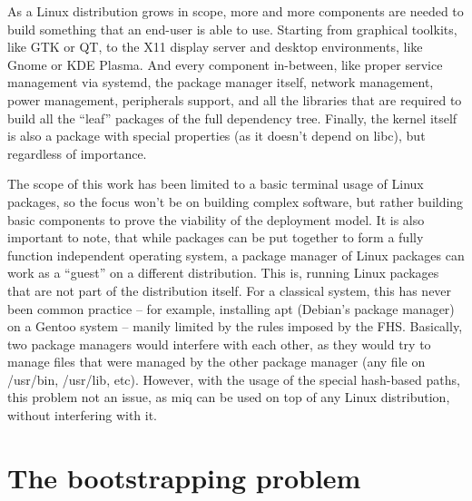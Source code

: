As a Linux distribution grows in scope, more and more
components are needed to build something that an end-user is
able to use. Starting from graphical toolkits, like GTK or
QT, to the X11 display server and desktop environments, like
Gnome or KDE Plasma. And every component in-between, like
proper service management via systemd, the package manager
itself, network management, power management, peripherals
support, and all the libraries that are required to build
all the ``leaf'' packages of the full dependency tree.
Finally, the kernel itself is also a package with special
properties (as it doesn't depend on libc), but regardless of
importance.

The scope of this work has been limited to a basic terminal
usage of Linux packages, so the focus won't be on building
complex software, but rather building basic components to
prove the viability of the deployment model. It is also
important to note, that while packages can be put together
to form a fully function independent operating system, a
package manager of Linux packages can work as a ``guest'' on
a different distribution. This is, running Linux packages
that are not part of the distribution itself. For a
classical system, this has never been common practice -- for
example, installing apt (Debian's package manager) on a
Gentoo system -- manily limited by the rules imposed by the
\acl{FHS}. Basically, two package managers would interfere
with each other, as they would try to manage files that were
managed by the other package manager (any file on /usr/bin,
/usr/lib, etc). However, with the usage of the special
hash-based paths, this problem not an issue, as miq can be
used on top of any Linux distribution, without interfering
with it.

\FloatBarrier
\section{The bootstrapping problem}
